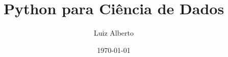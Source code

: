 \documentclass[t, final, 12pt, xcolor={usenames,dvipsnames}, table]{beamer}
\author{Luiz Alberto}
\title{Python para Ciência de Dados}
\institute{Ciência da Computação}
\date{\today}
\begin{document}
  \begin{frame}[t,plain]
    \titlepage
  \end{frame}
  
  
  
  
  
  
  
\end{document}
